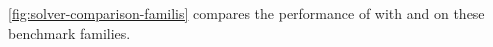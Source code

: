 
\autoref{fig:solver-comparison-familis} compares the performance of \tool
with \cadical and \prelearn on these benchmark families. 

